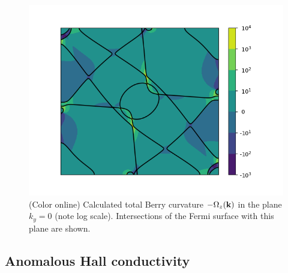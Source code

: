 \begin{figure}[b!]
\centering
\includegraphics[width=0.5\columnwidth]{figure/example18/Fe_Fermi_surface+Berry_phase.png}
\caption{(Color online) Calculated total Berry curvature $-\Omega_z(\bfk)$ in the plane $k_y=0$ (note log scale). Intersections of the Fermi surface
with this plane are shown.}\label{fig18.3}
\end{figure}

\subsection*{Anomalous Hall conductivity}

